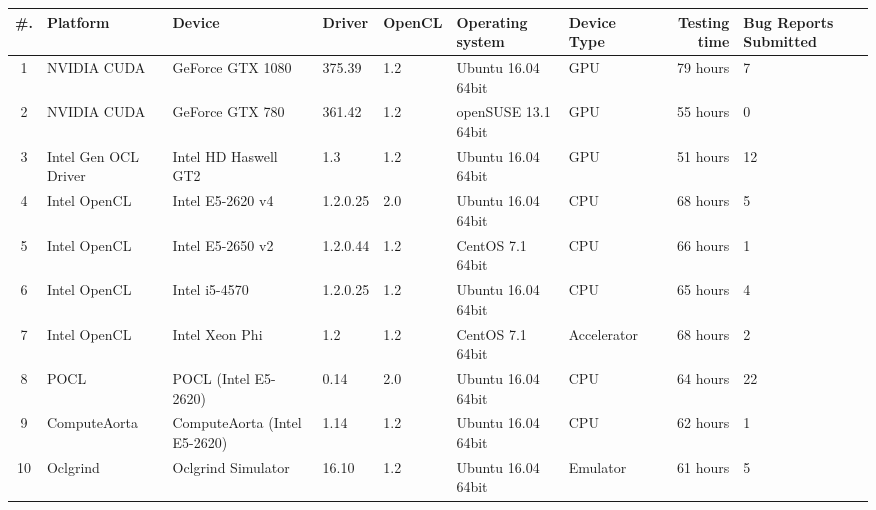 \begin{tabular}{ cllllll | rR{1.4cm} }
\toprule
\textbf{\#. } & \textbf{Platform} & \textbf{Device} & \textbf{Driver} & \textbf{OpenCL} & 
\textbf{Operating system} & \textbf{Device Type} & \textbf{Testing time} & \textbf{Bug Reports Submitted} \\
 & NVIDIA CUDA & GeForce GTX 1080 & 375.39 & 1.2 & Ubuntu 16.04 64bit & GPU & 79 hours & 7 \\
2 & NVIDIA CUDA & GeForce GTX 780 & 361.42 & 1.2 & openSUSE  13.1 64bit & GPU & 55 hours & 0 \\
3 & Intel Gen OCL Driver & Intel HD Haswell GT2 & 1.3 & 1.2 & Ubuntu 16.04 64bit & GPU & 51 hours & 12 \\
4 & Intel OpenCL & Intel E5-2620 v4 & 1.2.0.25 & 2.0 & Ubuntu 16.04 64bit & CPU & 68 hours & 5 \\
5 & Intel OpenCL & Intel E5-2650 v2 & 1.2.0.44 & 1.2 & CentOS 7.1 64bit & CPU & 66 hours & 1 \\
6 & Intel OpenCL & Intel i5-4570 & 1.2.0.25 & 1.2 & Ubuntu 16.04 64bit & CPU & 65 hours & 4 \\
7 & Intel OpenCL & Intel Xeon Phi & 1.2 & 1.2 & CentOS 7.1 64bit & Accelerator & 68 hours & 2 \\
8 & POCL & POCL (Intel E5-2620) & 0.14 & 2.0 & Ubuntu 16.04 64bit & CPU & 64 hours & 22 \\
9 & ComputeAorta & ComputeAorta (Intel E5-2620) & 1.14 & 1.2 & Ubuntu 16.04 64bit & CPU & 62 hours & 1 \\
10 & Oclgrind & Oclgrind Simulator & 16.10 & 1.2 & Ubuntu 16.04 64bit & Emulator & 61 hours & 5 \\

\bottomrule
\end{tabular}

